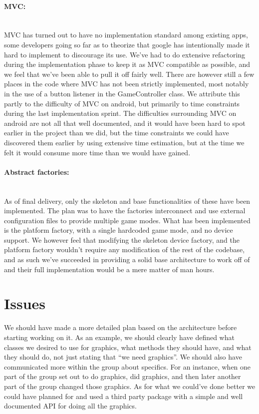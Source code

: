 \documentclass[12pt, a4paper]{article}
\begin{document}
\paragraph{MVC:}\\
MVC has turned out to have no implementation standard among existing apps, some
developers going so far as to theorize that google has intentionally made it
hard to implement to discourage its use. We’ve had to do extensive refactoring
during the implementation phase to keep it as MVC compatible as possible, and we
feel that we’ve been able to pull it off fairly well. There are however still a
few places in the code where MVC has not been strictly implemented, most notably
in the use of a button listener in the GameController class. We attribute this
partly to the difficulty of MVC on android, but primarily to time constraints
during the last implementation sprint.
The difficulties surrounding MVC on android are not all that well documented,
and it would have been hard to spot earlier in the project than we did, but the
time constraints we could have discovered them earlier by using extensive time
estimation, but at the time we felt it would consume more time than we would
have gained.

\paragraph{Abstract factories:}\\
As of final delivery, only the skeleton and base functionalities of these have
been implemented.
The plan was to have the factories interconnect and use external configuration
files to provide multiple game modes. What has been implemented is the platform
factory, with a single hardcoded game mode, and no device support.
We however feel that modifying the skeleton device factory, and the platform
factory wouldn’t require any modification of the rest of the codebase, and as
such we’ve succeeded in providing a solid base architecture to work off of and
their full implementation would be a mere matter of man hours.

\section{Issues}
We should have made a more detailed plan based on the architecture before
starting working on it. As an example, we should clearly have defined what
classes we desired to use for graphics, what methods they should have, and what
they should do, not just stating that “we need graphics”.
We should also have communicated more within the group about specifics. For an
instance, when one part of the group set out to do graphics, did graphics, and
then later another part of the group changed those graphics.
As for what we could’ve done better we could have planned for and used a third
party package with a simple and well documented API for doing all the graphics. 
\end{document}
